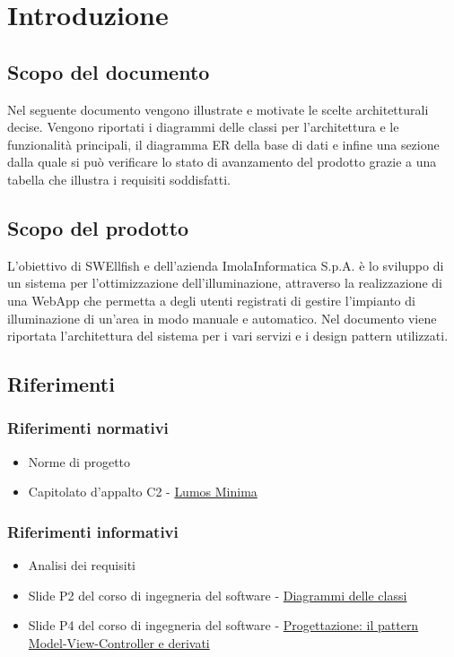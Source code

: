 \documentclass[12pt]{article}
\begin{document}
\tableofcontents

\pagebreak

\graphicspath{ {./UML/images/} }

\section{Introduzione}

\subsection{Scopo del documento}
Nel seguente documento vengono illustrate e motivate le scelte architetturali decise. Vengono riportati i diagrammi delle classi per l'architettura e le funzionalità principali,
il diagramma ER della base di dati e infine una sezione dalla quale si può verificare lo stato di avanzamento del prodotto grazie a una tabella che illustra
i requisiti soddisfatti.

\subsection{Scopo del prodotto}
L’obiettivo di SWEllfish e dell’azienda ImolaInformatica S.p.A. è lo sviluppo di un sistema per l’ottimizzazione dell’illuminazione, attraverso la realizzazione di una WebApp che permetta a degli utenti registrati di gestire l'impianto di illuminazione
di un'area in modo manuale e automatico. Nel documento viene riportata l'architettura del sistema per i vari servizi e i design pattern utilizzati.

\subsection{Riferimenti}
\subsubsection{Riferimenti normativi}
\begin{itemize}
	\item Norme di progetto
	\item Capitolato d'appalto C2 - \href{https://www.math.unipd.it/~tullio/IS-1/2022/Progetto/C2.pdf}{Lumos Minima}
\end{itemize}
\subsubsection{Riferimenti informativi}
\begin{itemize}
	\item Analisi dei requisiti
	\item Slide P2 del corso di ingegneria del software - \href{https://www.math.unipd.it/~rcardin/swea/2023/Diagrammi%20delle%20Classi.pdf}{Diagrammi delle classi}
	\item Slide P4 del corso di ingegneria del software - \href{https://www.math.unipd.it/~rcardin/sweb/2022/L02.pdf}{Progettazione: il pattern Model-View-Controller e derivati}
\end{itemize}
\end{document}
